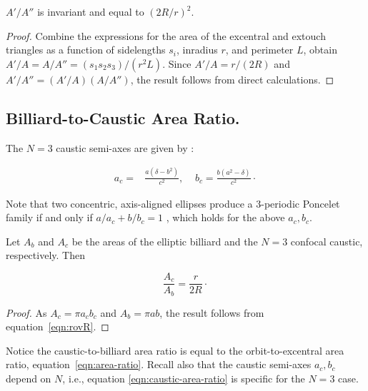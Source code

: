 \begin{theorem}
$A'/A''$ is invariant and equal to $(2R/r)^2$.
\label{thm:area-ratio-outer-inner}
\end{theorem}

\begin{proof}
Combine the expressions for the area of the excentral \cite[Excentral Triangle]{mw} and extouch triangles \cite[Extouch Triangle]{mw} as a function of sidelengths $s_i$, inradius $r$, and perimeter $L$, obtain $A'/A=A/A''=(s_1 s_2 s_3)/(r^2 L)$. Since $A'/A=r/(2R)$  and $A'/A''=(A'/A)(A/A'')$, the result follows from direct calculations.
\end{proof}

\subsection{Billiard-to-Caustic Area Ratio.}

The $N=3$ caustic semi-axes are given by \cite{garcia2019-ellipses,reznik2020-loci}:

\begin{align}
a_c=&\frac{a\left(\delta-{b}^{2}\right)}{c^2},\;\;\;\;
b_c=\frac{b\left({a}^{2}-\delta\right)}{c^2}\cdot
\end{align}

Note that two concentric, axis-aligned ellipses produce a 3-periodic Poncelet family if and only if $a/a_c+b/b_c=1$ \cite{georgiev2012-poncelet}, which holds for the above $a_c,b_c$. 


\begin{corollary}
\label{cor:caustica_billiard}
Let $A_b$ and $A_c$ be the areas of the elliptic billiard and the $N=3$ confocal caustic, respectively. Then

\begin{equation}
\frac{A_c}{A_b}=\frac{r}{2R}\cdot
\label{eqn:caustic-area-ratio}
\end{equation}
\end{corollary}

\begin{proof}
As $A_c=\pi{a_c}{b_c}$ and $A_b={\pi}{a}{b}$, the result follows from equation~\eqref{eqn:rovR}.
\end{proof}

  Notice the caustic-to-billiard area ratio is equal to the orbit-to-excentral area ratio, equation~\eqref{eqn:area-ratio}. Recall also that the caustic semi-axes $a_c,b_c$ depend on $N$, i.e., equation  \eqref{eqn:caustic-area-ratio} is specific for the $N=3$ case.

